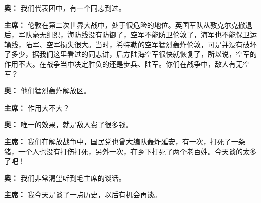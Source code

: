 \begin{duihua}
\item[\textbf{奥：}] 我们代表团中，有一个同志到过。

\item[\textbf{主席：}] 伦敦在第二次世界大战中，处于很危险的地位。英国军队从敦克尔克撤退后，军队毫无组织，海防线没有防御了，空军不能防卫伦敦了，海军也不能保卫运输线，陆军、空军损失很大。当时，希特勒的空军猛烈轰炸伦敦，可是并没有破坏了多少，据我们这里看过的同志讲，后方陆海空军很快就恢复了，所以说，空军的作用不大。在战争当中决定胜负的还是步兵、陆军。你们在战争中，敌人有无空军？

\item[\textbf{奥：}] 他们猛烈轰炸解放区。

\item[\textbf{主席：}] 作用大不大？

\item[\textbf{奥：}] 唯一的效果，就是敌人费了很多钱。

\item[\textbf{主席：}] 我们在解放战争中，国民党也曾大编队轰炸延安，有一次，打死了一条猪，一个人也没有打伤打死，另外一次，在乡下打死了两个老百姓。今天谈的太多了吧！

\item[\textbf{奥：}] 我们非常渴望听到毛主席的谈话。

\item[\textbf{主席：}] 我今天是谈了一点历史，以后有机会再谈。

 
\end{duihua}

